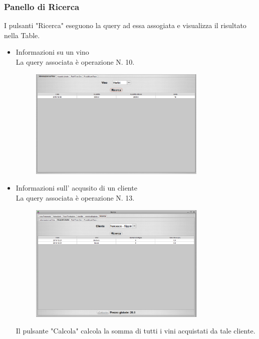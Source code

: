 \documentclass{article}
\begin{document}
\subsubsection{Panello di Ricerca}
I pulsanti "Ricerca"  eseguono la query ad essa assogiata e visualizza il risultato nella Table.\\
\begin{itemize}
\item Informazioni su un vino \\
La query associata è operazione N. 10.\\
\begin{figure}[htbp]
\centering
\includegraphics[width=0.8\textwidth]{img/panel_info_vino.png}
\end{figure}
\item Informazioni sull' acqusito di un cliente\\
La query associata è operazione N. 13.\\
\begin{figure}[htbp]
\centering
\includegraphics[width=0.8\textwidth]{img/panel_acquisto_cliente.png}
\end{figure}\newline
Il pulsante "Calcola" calcola la somma di tutti i vini acquistati da tale cliente.\\

\end{itemize}
\end{document}
